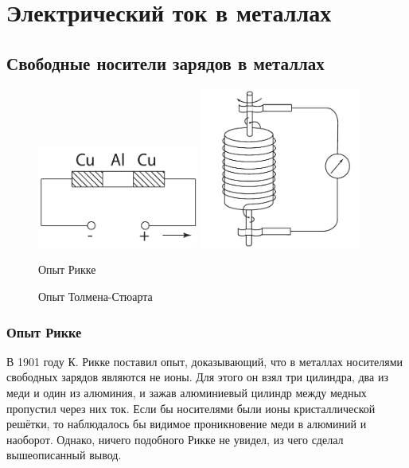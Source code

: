 \chapter{Электрический ток в металлах}

\section{Свободные носители зарядов в металлах}
    \begin{figure}[b!]
        \center
        \includegraphics[width=0.47\textwidth]{lec07/rikke.pdf}
        \hfill
        \includegraphics[width=0.47\textwidth]{lec07/tolman.pdf}
        \parbox[t]{.47\textwidth}{\caption{Опыт Рикке}}
        \hfill
        \parbox[t]{.47\textwidth}{\caption{Опыт Толмена-Стюарта}}
    \end{figure}


    \subsection{Опыт Рикке}
        В 1901 году К. Рикке поставил опыт, доказывающий, что в металлах
        носителями свободных зарядов являются не ионы. Для этого он взял три
        цилиндра, два из меди и один из алюминия, и зажав алюминиевый цилиндр
        между медных пропустил через них ток. Если бы носителями были ионы
        кристаллической решётки, то наблюдалось бы видимое проникновение меди в
        алюминий и наоборот. Однако, ничего подобного Рикке не увидел, из чего
        сделал вышеописанный вывод.
    
